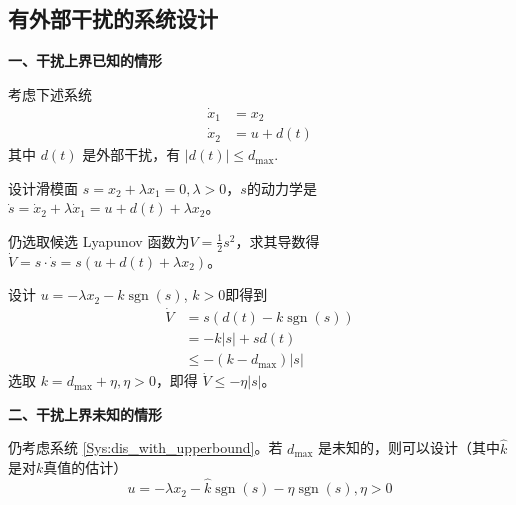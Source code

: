\subsection{有外部干扰的系统设计}\label{5C_disturbance}
\noindent\textbf{一、干扰上界已知的情形}

考虑下述系统
 \begin{equation}
      \begin{aligned}
    \dot{x}_1 & = x_2\\
    \dot{x}_2 & = u + d (t)
  \end{aligned}\label{Sys:dis_with_upperbound}
 \end{equation}
  其中 $d (t)$ 是外部干扰，有 $| d (t) | \leq d_{\max}$.
  
  设计滑模面 $s = x_2 + \lambda x_1=0, \lambda > 0$，$s$的动力学是 $\dot{s} = \dot{x}_2 + \lambda \dot{x}_1 = u + d (t)
  + \lambda x_2$。
  
  仍选取候选 Lyapunov 函数为$V = \frac{1}{2} s^2$，求其导数得 $\dot{V} = s \cdot \dot{s} = s (u + d (t) + \lambda x_2)$。
  
  设计 $u = - \lambda x_2 - k  \ensuremath{\operatorname{sgn}} (s)$, $k >
  0$即得到
  \begin{align*}
    \dot{V} & = s (d (t) - k  \ensuremath{\operatorname{sgn}} (s))\\
    & = - k  | s | + s  d (t)\\
    & \leq - (k - d_{\max})  | s |
  \end{align*}
  选取 $k = d_{\max} + \eta, \eta > 0$，即得 $\dot{V} \leq - \eta | s |$。

\noindent\textbf{二、干扰上界未知的情形}

  仍考虑系统 \eqref{Sys:dis_with_upperbound}。若 $d_{\max}$ 是未知的，则可以设计（其中$\hat{k}$是对$k$真值的估计）
  \[ u = - \lambda x_2 - \hat{k} \ensuremath{\operatorname{sgn}} (s)- \eta\ensuremath{\operatorname{sgn}} (s),\eta>0 \]
  
